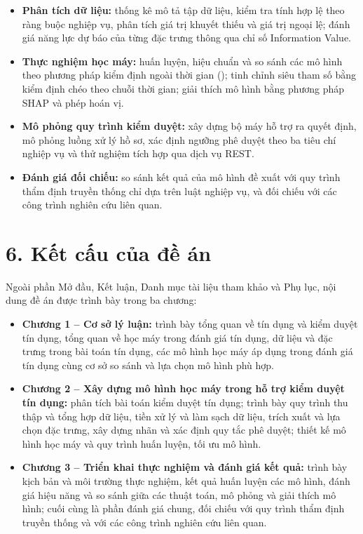 \begin{itemize}
  \item \textbf{Phân tích dữ liệu:} thống kê mô tả tập dữ liệu, kiểm tra tính hợp
  lệ theo ràng buộc nghiệp vụ, phân tích giá trị khuyết thiếu và giá trị ngoại
  lệ; đánh giá năng lực dự báo của từng đặc trưng thông qua chỉ số Information
  Value.

  \item \textbf{Thực nghiệm học máy:} huấn luyện, hiệu chuẩn và so sánh các mô
  hình theo phương pháp kiểm định ngoài thời gian ();
  tinh chỉnh siêu tham số bằng kiểm định chéo theo chuỗi thời gian; giải thích mô
  hình bằng phương pháp SHAP và phép hoán vị.

  \item \textbf{Mô phỏng quy trình kiểm duyệt:} xây dựng bộ máy hỗ trợ ra quyết
  định, mô phỏng luồng xử lý hồ sơ, xác định ngưỡng phê duyệt theo ba tiêu chí
  nghiệp vụ và thử nghiệm tích hợp qua dịch vụ REST.

  \item \textbf{Đánh giá đối chiếu:} so sánh kết quả của mô hình đề xuất với quy
  trình thẩm định truyền thống chỉ dựa trên luật nghiệp vụ, và đối chiếu với các
  công trình nghiên cứu liên quan.
\end{itemize}

\section*{6. Kết cấu của đề án}

Ngoài phần Mở đầu, Kết luận, Danh mục tài liệu tham khảo và Phụ lục, nội dung đề
án được trình bày trong ba chương:

\begin{itemize}
  \item \textbf{Chương 1 -- Cơ sở lý luận:} trình bày tổng quan về tín dụng và
  kiểm duyệt tín dụng, tổng quan về học máy trong đánh giá tín dụng, dữ liệu và
  đặc trưng trong bài toán tín dụng, các mô hình học máy áp dụng trong đánh giá
  tín dụng cùng cơ sở so sánh và lựa chọn mô hình phù hợp.

  \item \textbf{Chương 2 -- Xây dựng mô hình học máy trong hỗ trợ kiểm duyệt tín
  dụng:} phân tích bài toán kiểm duyệt tín dụng; trình bày quy trình thu thập
  và tổng hợp dữ liệu, tiền xử lý và làm sạch dữ liệu, trích xuất và lựa chọn đặc trưng, xây
  dựng nhãn và xác định quy tắc phê duyệt; thiết kế mô hình học máy và quy trình
  huấn luyện, tối ưu mô hình.

  \item \textbf{Chương 3 -- Triển khai thực nghiệm và đánh giá kết quả:} trình
  bày kịch bản và môi trường thực nghiệm, kết quả huấn luyện các mô hình, đánh
  giá hiệu năng và so sánh giữa các thuật toán, mô phỏng và giải thích mô hình;
  cuối cùng là phần đánh giá chung, đối chiếu với quy trình thẩm định
  truyền thống và với các công trình nghiên cứu liên quan.
\end{itemize}
